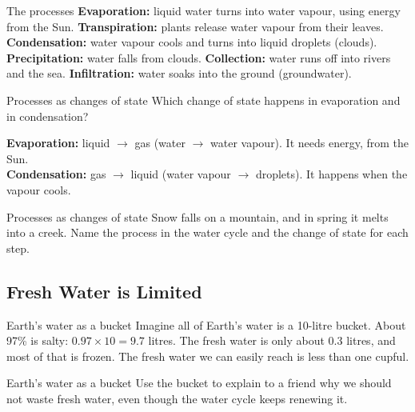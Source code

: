 \begin{skillbox}{The processes}
\textbf{Evaporation:} liquid water turns into water vapour, using energy from the Sun. \quad \textbf{Transpiration:} plants release water vapour from their leaves. \quad \textbf{Condensation:} water vapour cools and turns into liquid droplets (clouds). \quad \textbf{Precipitation:} water falls from clouds. \quad \textbf{Collection:} water runs off into rivers and the sea. \quad \textbf{Infiltration:} water soaks into the ground (groundwater).
\end{skillbox}

\begin{workedex}{Processes as changes of state}
Which change of state happens in evaporation and in condensation?

\smallskip
\textbf{Evaporation:} liquid $\rightarrow$ gas (water $\rightarrow$ water vapour). It needs energy, from the Sun.\\
\textbf{Condensation:} gas $\rightarrow$ liquid (water vapour $\rightarrow$ droplets). It happens when the vapour cools.
\end{workedex}

\begin{wedo}{Processes as changes of state}
Snow falls on a mountain, and in spring it melts into a creek. Name the process in the water cycle and the change of state for each step.
\answerbox{4cm}
\end{wedo}

\subsection{Fresh Water is Limited}\label{sub:1.2}

\begin{workedex}{Earth's water as a bucket}
Imagine all of Earth's water is a 10-litre bucket. About 97\% is salty: $0.97 \times 10 = 9.7$ litres. The fresh water is only about 0.3 litres, and most of that is frozen. The fresh water we can easily reach is less than one cupful.
\end{workedex}

\begin{wedo}{Earth's water as a bucket}
Use the bucket to explain to a friend why we should not waste fresh water, even though the water cycle keeps renewing it.
\answerbox{4cm}
\end{wedo}

\label{prac:1}

